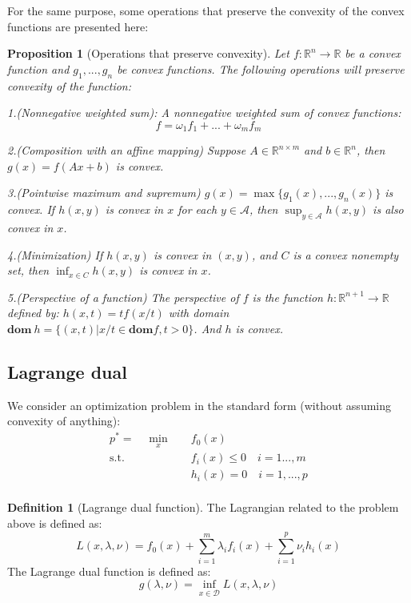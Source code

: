 \documentclass[
]{book}
\newtheorem{proposition}{Proposition}[chapter]
\theoremstyle{definition}
\newtheorem{definition}{Definition}[chapter]
\theoremstyle{definition}
\theoremstyle{definition}
\theoremstyle{definition}
\theoremstyle{remark}
\begin{document}
For the same purpose, some operations that preserve the convexity of the convex functions are presented here:

\begin{proposition}[Operations that preserve convexity]
\protect\hypertarget{prp:preservecvx}{}\label{prp:preservecvx}Let \(f:\mathbb{R}^n\to\mathbb{R}\) be a convex function and \(g_1,...,g_n\) be convex functions. The following operations will preserve convexity of the function:

1.(Nonnegative weighted sum): A nonnegative weighted sum of convex functions: \[f = \omega_1f_1 + ... +\omega_mf_m\]

2.(Composition with an affine mapping) Suppose \(A\in \mathbb{R}^{n\times m}\) and \(b\in \mathbb{R}^n\), then \(g(x) = f(Ax+b)\) is convex.

3.(Pointwise maximum and supremum) \(g(x) = \max\{g_1(x),...,g_n(x)\}\) is convex. If \(h(x,y)\) is convex in \(x\) for each \(y\in\mathcal{A}\), then \(\sup_{y\in\mathcal{A}} h(x,y)\) is also convex in \(x\).

4.(Minimization) If \(h(x,y)\) is convex in \((x,y)\), and \(C\) is a convex nonempty set, then \(\inf_{x\in C} h(x,y)\) is convex in \(x\).

5.(Perspective of a function) The perspective of \(f\) is the function \(h:\mathbb{R}^{n+1}\to\mathbb{R}\) defined by: \(h(x,t) = tf(x/t)\) with domain \(\textbf{dom}\ h=\{(x,t)|x/t\in\textbf{dom} f,t>0\}\). And \(h\) is convex.
\end{proposition}

\hypertarget{lagrange-dual}{%
\subsection{Lagrange dual}\label{lagrange-dual}}

We consider an optimization problem in the standard form (without assuming convexity of anything):
\begin{equation}
\begin{aligned}
p^* = \quad \min_{x} \quad & f_0(x)\\
\textrm{s.t.} \quad & f_i(x)\leq 0\quad i=1...,m\\
  & h_i(x) = 0\quad i=1,...,p   \\
\end{aligned}
\end{equation}

\begin{definition}[Lagrange dual function]
\protect\hypertarget{def:defdualfunc}{}\label{def:defdualfunc}The Lagrangian related to the problem above is defined as: \[L(x,\lambda,\nu)=f_0(x)+\sum_{i=1}^m\lambda_if_i(x)+\sum_{i=1}^p\nu_ih_i(x)\]
The Lagrange dual function is defined as: \[g(\lambda,\nu) = \inf_{x\in\mathcal{D}}L(x,\lambda,\nu)\]
\end{definition}
\end{document}
